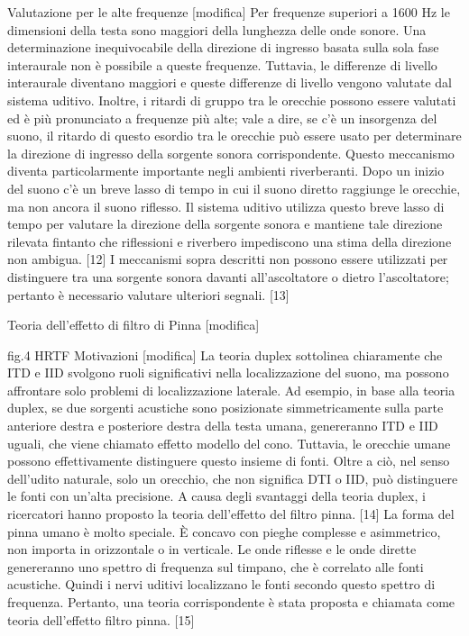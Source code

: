 {Valutazione per le alte frequenze [modifica]
Per frequenze superiori a 1600 Hz le dimensioni della testa sono maggiori della lunghezza delle onde sonore. Una determinazione inequivocabile della direzione di ingresso basata sulla sola fase interaurale non è possibile a queste frequenze. Tuttavia, le differenze di livello interaurale diventano maggiori e queste differenze di livello vengono valutate dal sistema uditivo. Inoltre, i ritardi di gruppo tra le orecchie possono essere valutati ed è più pronunciato a frequenze più alte; vale a dire, se c'è un insorgenza del suono, il ritardo di questo esordio tra le orecchie può essere usato per determinare la direzione di ingresso della sorgente sonora corrispondente. Questo meccanismo diventa particolarmente importante negli ambienti riverberanti. Dopo un inizio del suono c'è un breve lasso di tempo in cui il suono diretto raggiunge le orecchie, ma non ancora il suono riflesso. Il sistema uditivo utilizza questo breve lasso di tempo per valutare la direzione della sorgente sonora e mantiene tale direzione rilevata fintanto che riflessioni e riverbero impediscono una stima della direzione non ambigua. [12] I meccanismi sopra descritti non possono essere utilizzati per distinguere tra una sorgente sonora davanti all'ascoltatore o dietro l'ascoltatore; pertanto è necessario valutare ulteriori segnali. [13]

Teoria dell'effetto di filtro di Pinna [modifica]

fig.4 HRTF
Motivazioni [modifica]
La teoria duplex sottolinea chiaramente che ITD e IID svolgono ruoli significativi nella localizzazione del suono, ma possono affrontare solo problemi di localizzazione laterale. Ad esempio, in base alla teoria duplex, se due sorgenti acustiche sono posizionate simmetricamente sulla parte anteriore destra e posteriore destra della testa umana, genereranno ITD e IID uguali, che viene chiamato effetto modello del cono. Tuttavia, le orecchie umane possono effettivamente distinguere questo insieme di fonti. Oltre a ciò, nel senso dell'udito naturale, solo un orecchio, che non significa DTI o IID, può distinguere le fonti con un'alta precisione. A causa degli svantaggi della teoria duplex, i ricercatori hanno proposto la teoria dell'effetto del filtro pinna. [14] La forma del pinna umano è molto speciale. È concavo con pieghe complesse e asimmetrico, non importa in orizzontale o in verticale. Le onde riflesse e le onde dirette genereranno uno spettro di frequenza sul timpano, che è correlato alle fonti acustiche. Quindi i nervi uditivi localizzano le fonti secondo questo spettro di frequenza. Pertanto, una teoria corrispondente è stata proposta e chiamata come teoria dell'effetto filtro pinna. [15]

}

